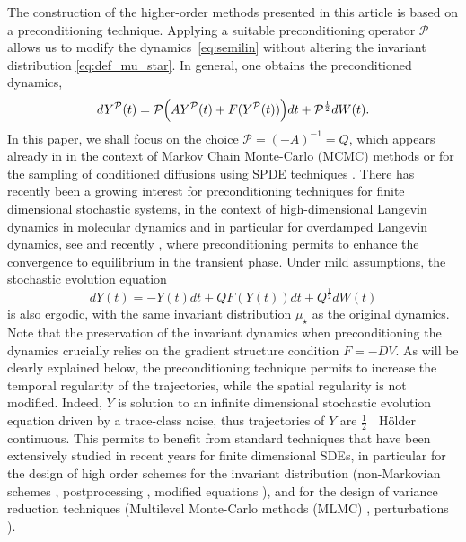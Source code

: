 \documentclass[11pt]{amsart}
\begin{document}
The construction of the higher-order methods presented in this article is based on a preconditioning technique. Applying a suitable preconditioning operator $\mathcal{P}$ allows us to modify the dynamics~\eqref{eq:semilin} without altering the invariant distribution \eqref{eq:def_mu_star}. In general, one obtains the preconditioned dynamics,
\[
dY^{\mathcal{P}}(t)=\mathcal{P}\Bigl(AY^{\mathcal{P}}(t)+F(Y^{\mathcal{P}}(t))\Bigr)dt+\mathcal{P}^{\frac12}dW(t).
\]
In this paper, we shall focus on the choice $\mathcal{P}=(-A)^{-1}=Q$, which appears already in \cite{Cotter_Roberts_Stuart_White:13, ReyBellet_Spiliopoulos_2016, Hairer_Stuart_Vollmer:14} in the context of Markov Chain Monte-Carlo (MCMC) methods
or for the
sampling of conditioned diffusions using SPDE techniques \cite{Hairer_Stuart_Voss:09,Hairer-Stuart-Voss:07,Hairer-Stuart-Voss:05}. There has recently been a growing interest for preconditioning techniques for finite dimensional stochastic systems, in the context of high-dimensional Langevin dynamics in molecular dynamics
\cite{Best_Hummer_2010, Hummer2005PositiondependentDC} and in particular
for overdamped Langevin dynamics, see \cite{ReyBellet_Spiliopoulos_2016, Roberts_Stramer_2002} and recently \cite{Bronasco25els, Cui_Tong_Zahm_2024,Lelievre_Pavliotis_Robin_Santet_Stoltz_2024,Lelievre_Santet_Stoltz_2024,Lelievre_Santet_Stoltz_2024B}, where preconditioning permits to enhance the convergence to equilibrium in the transient phase.
Under mild assumptions, the stochastic evolution equation
\[
dY(t)=-Y(t)dt+QF(Y(t))dt+Q^{\frac12}dW(t)
\]
is also ergodic, with the same invariant distribution $\mu_\star$ as the original dynamics. Note that the preservation of the invariant dynamics when preconditioning the dynamics crucially relies on the gradient structure condition $F=-DV$. As will be clearly explained below, the preconditioning technique permits to increase the temporal regularity of the trajectories, while the spatial regularity is not modified. Indeed, $Y$ is solution to an infinite dimensional stochastic evolution equation driven by a trace-class noise, thus trajectories of $Y$ are $\frac12^-$ H\"older continuous. 
This permits to benefit from standard techniques that have been extensively studied in recent years for finite dimensional SDEs, in particular for the design of high order schemes for the invariant distribution (non-Markovian schemes \cite{Leimkuhler13rco}, postprocessing \cite{Abdulle17oes,Vilmart15pif}, modified equations \cite{Abdulle12hwo, Bronasco22cef, Laurent20eab}), and for the design of variance reduction techniques  (Multilevel Monte-Carlo methods (MLMC) \cite{Giles08mmc,Giles15mmc}, perturbations \cite{Abdulle19act, Duncan16vru, Lelievre13onr}).
\end{document}
